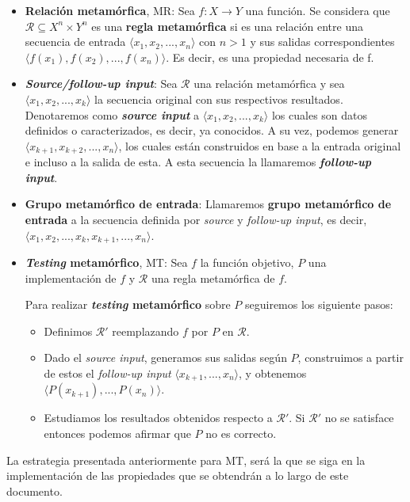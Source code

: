 \begin{itemize}
    \item \textbf{Relación metamórfica}, MR: Sea $f: X \rightarrow Y$ una función. Se considera que $\mathscr{R} \subseteq X^{n} \times Y^{n}$ es una \textbf{regla metamórfica} si es una relación entre una secuencia de entrada $\langle x_{1},x_{2},...,x_{n}\rangle$ con $n>1$ y sus salidas correspondientes $\langle f(x_{1}),f(x_{2}),...,f(x_{n})\rangle$. Es decir, es una propiedad necesaria de f.
    \item \textbf{\textit{Source/follow-up input}}: Sea $\mathscr{R}$ una relación metamórfica y sea $\langle x_{1},x_{2},...,x_{k}\rangle$ la secuencia original con sus respectivos resultados. Denotaremos como \textbf{\textit{source input}} a   $\langle x_{1},x_{2},...,x_{k}\rangle$  los cuales son datos definidos o caracterizados, es decir, ya conocidos. A su vez, podemos generar $\langle x_{k+1},x_{k+2},...,x_{n}\rangle$, los cuales están construidos en base a la entrada original e incluso a la salida de esta. A esta secuencia la llamaremos \textbf{\textit{follow-up input}}.
    \item \textbf{Grupo metamórfico de entrada}: Llamaremos \textbf{grupo metamórfico de entrada} a la secuencia definida por \textit{source} y \textit{follow-up input}, es decir, $\langle x_{1},x_{2},...,x_{k},x_{k+1},...,x_{n}\rangle$.
    \item \textbf{\textit{Testing} metamórfico}, MT\label{Def:MT}: Sea $f$ la función objetivo, $P$ una implementación de $f$ y $\mathscr{R}$ una regla metamórfica de $f$.
    
    Para realizar \textbf{\textit{testing} metamórfico} sobre $P$ seguiremos los siguiente pasos:
    \begin{itemize}
        \item Definimos $\mathscr{R}'$ reemplazando $f$ por $P$ en $\mathscr{R}$.
        \item Dado el \textit{source input}, generamos sus salidas según $P$, construimos a partir de estos el \textit{follow-up input} $\langle x_{k+1},...,x_{n}\rangle$, y obtenemos $\langle P(x_{k+1}),...,P(x_{n})\rangle$.
        \item Estudiamos los resultados obtenidos respecto a $\mathscr{R}'$. Si $\mathscr{R}'$ no se satisface entonces podemos afirmar que $P$ no es correcto.
    \end{itemize}
\end{itemize}

La estrategia presentada anteriormente para MT, será la que se siga en la implementación de las propiedades que se obtendrán a lo largo de este documento. \newline


